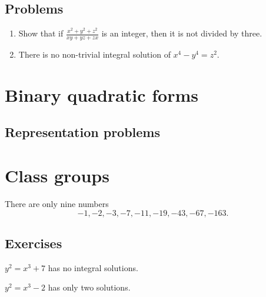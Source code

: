 \documentclass{../../large}
\begin{document}
\section*{Problems}

\begin{enumerate}
\item Show that if $\frac{x^2+y^2+z^2}{xy+yz+zx}$ is an integer, then it is not divided by three.
\item There is no non-trivial integral solution of $x^4-y^4=z^2$.
\end{enumerate}




\chapter{Binary quadratic forms}
\section{Representation problems}


\chapter{Class groups}

\begin{prb}
There are only nine numbers
\[-1,-2,-3,-7,-11,-19,-43,-67,-163.\]
\end{prb}

\section*{Exercises}
\begin{prb}
\begin{parts}
\item $y^2=x^3+7$ has no integral solutions.
\end{parts}
\end{prb}

\begin{prb}
\begin{parts}
\item $y^2=x^3-2$ has only two solutions.
\end{parts}
\end{prb}
\end{document}
